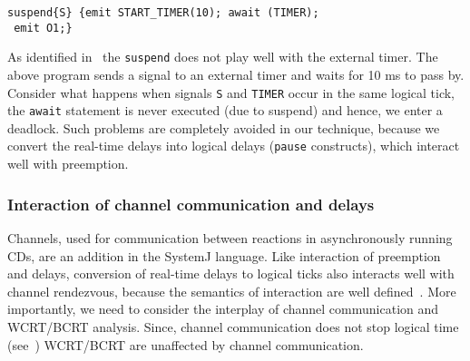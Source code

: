 \begin{verbatim}
suspend{S} {emit START_TIMER(10); await (TIMER); 
 emit O1;}
\end{verbatim}

As identified in~\cite{Bourke2009a} the \texttt{suspend} does not play
well with the external timer. The above program sends a signal to an
external timer and waits for 10 ms to pass by. Consider what happens
when signals \texttt{S} and \texttt{TIMER} occur in the same logical
tick, the \texttt{await} statement is never executed (due to suspend)
and hence, we enter a deadlock. Such problems are completely avoided in
our technique, because we convert the real-time delays into logical
delays (\texttt{pause} constructs), which interact well with preemption.

\subsubsection{Interaction of channel communication and delays}
\label{sec:inter-chann-comm}

Channels, used for communication between reactions in asynchronously
running CDs, are an addition in the SystemJ language. Like interaction
of preemption and delays, conversion of real-time delays to logical
ticks also interacts well with channel rendezvous, because the semantics
of interaction are well defined~\cite{amal10}. More importantly, we need
to consider the interplay of channel communication and WCRT/BCRT
analysis. Since, channel communication does not stop logical time
(see~\cite{amal10}) WCRT/BCRT are unaffected by channel
communication. %


